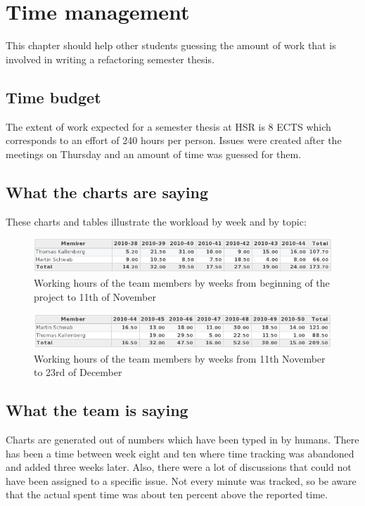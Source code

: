\chapter{Time management}
\thispagestyle{fancy}
This chapter should help other students guessing the amount of work that is 
involved in writing a refactoring semester thesis.

\section{Time budget}
The extent of work expected for a semester thesis at HSR is 8 ECTS which 
corresponds to an effort of 240 hours per person. Issues were created after 
the meetings on Thursday and an amount of time was guessed for them. 

\section{What the charts are saying}
These charts and tables illustrate the workload by week and by topic:

\begin{figure}[h]
\includegraphics[width=1\textwidth]{images/timetable1.png}
\caption{Working hours of the team members by weeks from beginning of the
project to 11th of November}
\label{timetable1}
\end{figure}

\begin{figure}[h]
\includegraphics[width=1\textwidth]{images/timetable2.png}
\caption{Working hours of the team members by weeks from 11th November to 23rd
of December}
\label{timetable2}
\end{figure}

\section{What the team is saying}
Charts are generated out of numbers which have been typed in by humans. There 
has been a time between week eight and ten where time tracking was abandoned and 
added three weeks later. Also, there were a lot of discussions that could not 
have been assigned to a specific issue. Not every minute was tracked, so be 
aware that the actual spent time was about ten percent above the reported time.
